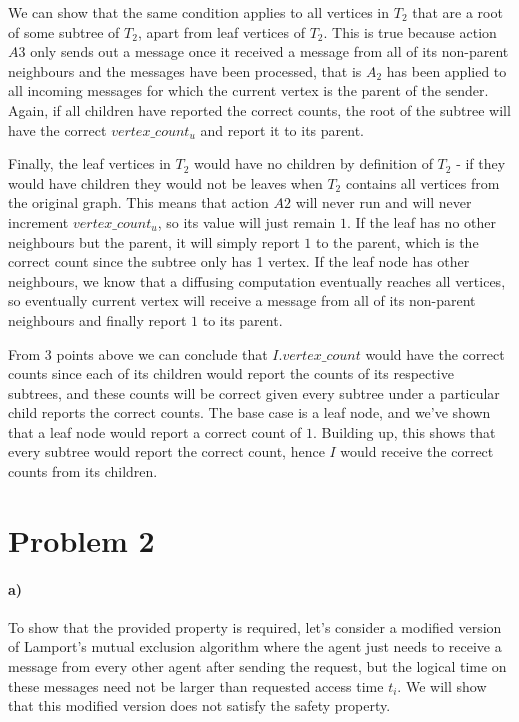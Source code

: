 \documentclass[10pt,letter]{article}
\begin{document}
We can show that the same condition applies to all vertices in $T_2$ that are a root of some subtree of $T_2$, apart from leaf vertices of $T_2$. This is true because action $A3$ only sends out a message once it received a message from all of its non-parent neighbours and the messages have been processed, that is $A_2$ has been applied to all incoming messages for which the current vertex is the parent of the sender. Again, if all children have reported the correct counts, the root of the subtree will have the correct $vertex\_count_u$ and report it to its parent.

Finally, the leaf vertices in $T_2$ would have no children by definition of $T_2$ - if they would have children they would not be leaves when $T_2$ contains all vertices from the original graph. This means that action $A2$ will never run and will never increment $vertex\_count_u$, so its value will just remain $1$. If the leaf has no other neighbours but the parent, it will simply report $1$ to the parent, which is the correct count since the subtree only has 1 vertex. If the leaf node has other neighbours, we know that a diffusing computation eventually reaches all vertices, so eventually current vertex will receive a message from all of its non-parent neighbours and finally report $1$ to its parent.

From 3 points above we can conclude that $I.vertex\_count$ would have the correct counts since each of its children would report the counts of its respective subtrees, and these counts will be correct given every subtree under a particular child reports the correct counts. The base case is a leaf node, and we've shown that a leaf node would report a correct count of $1$. Building up, this shows that every subtree would report the correct count, hence $I$ would receive the correct counts from its children.

\section*{Problem 2}

\paragraph{a)} To show that the provided property is required, let's consider a modified version of Lamport's mutual exclusion algorithm where the agent just needs to receive a message from every other agent after sending the request, but the logical time on these messages need not be larger than requested access time $t_i$. We will show that this modified version does not satisfy the safety property.
\end{document}
